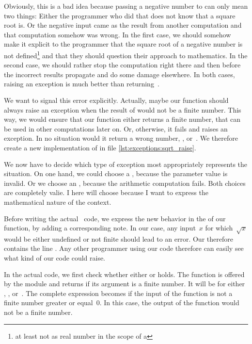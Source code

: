 Obviously, this is a bad idea because passing a negative number to  can only mean two things:
Either the programmer who did that does not know that a square root is.
Or the negative input came as the result from another computation and that computation somehow was wrong.
In the first case, we should somehow make it explicit to the programmer that the square root of a negative number is not defined\footnote{at least not as real number in the scope of a } and that they should question their approach to mathematics.
In the second case, we should rather stop the computation right there and then before the incorrect results propagate and do some damage elsewhere.
In both cases, raising an exception is much better than returning~.

We want to signal this error explicitly.
Actually, maybe our function should always raise an exception when the result of  would not be a finite number.
This way, we would ensure that our function either returns a finite number, that can be used in other computations later on.
Or, otherwise, it fails and raises an exception.
In no situation would it return a wrong number, , or~.
We therefore create a new implementation of  in file  \cref{lst:exceptions:sqrt_raise}.

We now have to decide which type of exception most appropriately represents the situation.
On one hand, we could choose a , because the parameter value is invalid.
Or we choose an , because the arithmetic computation fails.
Both choices are completely valie.
I here will choose  because I want to express the mathematical nature of the context.

Before writing the actual \python\ code, we express the new behavior in the  of our function, by adding a corresponding  note.
In our case, any input~$x$ for which~$\sqrt{x}$ would be either undefined or not finite should lead to an error.
Our  therefore contains the line .
Any other programmer using our code therefore can easily see what kind of  our code could raise.

In the actual code, we first check whether either  or  holds.
The  function is offered by the  module and returns  if its argument is a finite number.
It will be  for either , , or~.
The complete expression becomes  if the input of the function is not a finite number greater or equal~0.
In this case, the output of the  function would not be a finite number.


